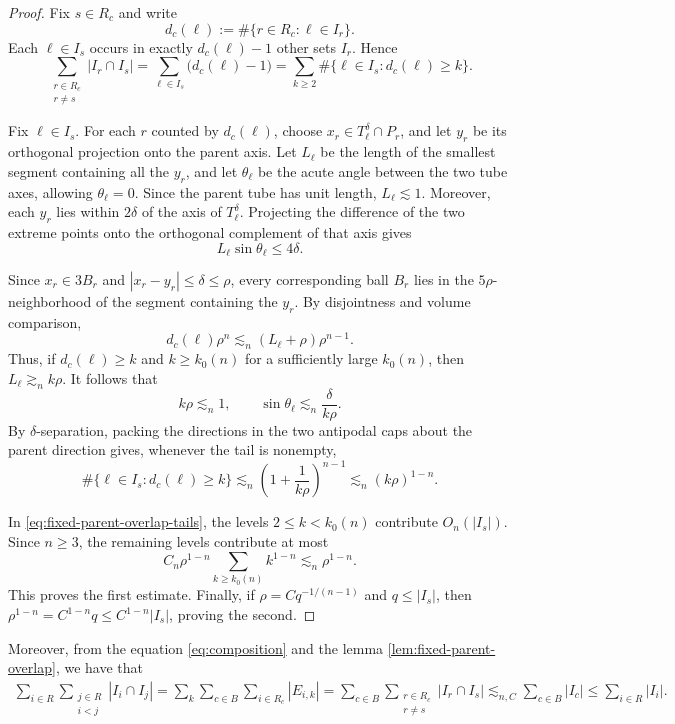 \documentclass[11pt, letterpaper]{nyjm}
\begin{document}
\begin{proof}
	Fix \(s\in R_c\) and write
	\[
	d_c(\ell):=\#\{r\in R_c:\ell\in I_r\}.
	\]
	Each \(\ell\in I_s\) occurs in exactly \(d_c(\ell)-1\) other sets
	\(I_r\). Hence
	\begin{equation}
		\label{eq:fixed-parent-overlap-tails}
		\sum_{\substack{r\in R_c\\r\ne s}}|I_r\cap I_s|
		=
		\sum_{\ell\in I_s}\bigl(d_c(\ell)-1\bigr)
		=
		\sum_{k\ge2}\#\{\ell\in I_s:d_c(\ell)\ge k\}.
	\end{equation}
	
	Fix \(\ell\in I_s\). For each \(r\) counted by \(d_c(\ell)\), choose
	\(x_r\in T_\ell^\delta\cap P_r\), and let \(y_r\) be its orthogonal
	projection onto the parent axis. Let \(L_\ell\) be the length of the
	smallest segment containing all the \(y_r\), and let \(\theta_\ell\)
	be the acute angle between the two tube axes, allowing
	\(\theta_\ell=0\). Since the parent tube has unit length,
	\(L_\ell\lesssim1\). Moreover, each \(y_r\) lies within \(2\delta\)
	of the axis of \(T_\ell^\delta\). Projecting the difference of the
	two extreme points onto the orthogonal complement of that axis gives
	\[
	L_\ell\sin\theta_\ell\le4\delta.
	\]
	
	Since \(x_r\in3B_r\) and \(|x_r-y_r|\le\delta\le\rho\), every
	corresponding ball \(B_r\) lies in the \(5\rho\)-neighborhood of
	the segment containing the \(y_r\). By disjointness and volume comparison,
	\[
	d_c(\ell)\rho^n
	\lesssim_n (L_\ell+\rho)\rho^{n-1}.
	\]
	Thus, if \(d_c(\ell)\ge k\) and \(k\ge k_0(n)\) for a sufficiently
	large \(k_0(n)\), then \(L_\ell\gtrsim_n k\rho\). It follows that
	\[
	k\rho\lesssim_n1,
	\qquad
	\sin\theta_\ell\lesssim_n\frac{\delta}{k\rho}.
	\]
	By \(\delta\)-separation, packing the directions in the two antipodal
	caps about the parent direction gives, whenever the tail is nonempty,
	\[
	\#\{\ell\in I_s:d_c(\ell)\ge k\}
	\lesssim_n
	\left(1+\frac{1}{k\rho}\right)^{n-1}
	\lesssim_n (k\rho)^{1-n}.
	\]
	
	In \eqref{eq:fixed-parent-overlap-tails}, the levels \(2\le k<k_0(n)\)
	contribute \(O_n(|I_s|)\). Since \(n\ge3\), the remaining levels
	contribute at most
	\[
	C_n\rho^{1-n}\sum_{k\ge k_0(n)}k^{1-n}
	\lesssim_n \rho^{1-n}.
	\]
	This proves the first estimate. Finally, if
	\(\rho=Cq^{-1/(n-1)}\) and \(q\le|I_s|\), then
	\(\rho^{1-n}=C^{1-n}q\le C^{1-n}|I_s|\), proving the second.
\end{proof}

Moreover, from the equation \eqref{eq:composition} and the lemma \ref{lem:fixed-parent-overlap}, we have  that 
\begin{align*}
\sum_{i\in R}\sum_{\substack{j\in R\\ i <j}} |I_i\cap I_j| = \sum_k\sum_{c \in B}\sum_{i\in R_c}|E_{i,k}|
= \sum_{c \in B}
\sum_{\substack{r\in R_c\\r\ne s}}|I_r\cap I_s|
\lesssim_{n,C}\sum_{c \in B}|I_c|
\leq \sum_{i \in R}|I_i|.
\end{align*}
\end{document}
